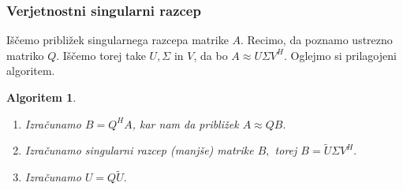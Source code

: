 \documentclass{beamer}
\newtheorem{algoritem}{Algoritem}
\begin{document}
\begin{frame}
\frametitle{Verjetnostni singularni razcep}

Iščemo približek singularnega razcepa matrike $A$. Recimo, da poznamo ustrezno matriko $Q.$ Iščemo torej take $U, \Sigma$ in $V$, da bo $A \approx U \Sigma V^H.$ Oglejmo si prilagojeni algoritem.

\begin{algoritem}
\begin{enumerate}
\item Izračunamo $B = Q^H A$, kar nam da približek $A \approx QB.$
\item Izračunamo singularni razcep (manjše) matrike $B,$ torej $B = \tilde{U} \Sigma V^H.$
\item Izračunamo $U = Q \tilde{U}.$
\end{enumerate}
\end{algoritem}

\end{frame}
\end{document}
